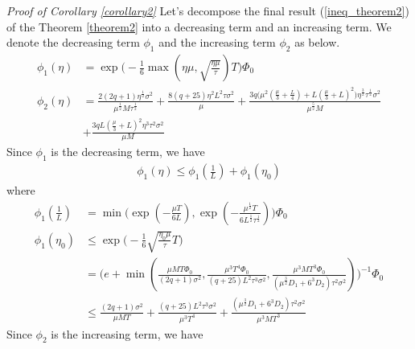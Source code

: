 \documentclass[11pt]{article}
\begin{document}
\emph{Proof of Corollary \ref{corollary2}} \textrm{ } Let's decompose the final result (\ref{ineq_theorem2}) of the Theorem \ref{theorem2} into a decreasing term and an increasing term. We denote the decreasing term $\phi_1$ and the increasing term $\phi_2$ as below.
\begin{align*}
    \phi_1(\eta) &= \exp\Big( -\frac{1}{6}\max(\eta\mu, \sqrt{\frac{\eta\mu}{\tau}})T \Big)\Phi_0 \\
    \phi_2(\eta) &= \frac{2(2q+1)\eta^{\frac{1}{2}}\sigma^2}{\mu^{\frac{1}{2}}M\tau^{\frac{1}{2}}} + \frac{8(q+25)\eta^2 L^2\tau\sigma^2}{\mu} + \frac{3q\Big(\mu^2(\frac{\mu}{3}+\frac{L}{4}) + L(\frac{\mu}{3}+L)^2\Big)\eta^{\frac{3}{2}}\tau^{\frac{1}{2}}\sigma^2}{\mu^{\frac{5}{2}}M} \\
    &+ \frac{3qL(\frac{\mu}{3}+L)^2 \eta^3\tau^2\sigma^2}{\mu M}
\end{align*}
Since $\phi_1$ is the decreasing term, we have
\begin{align} \label{ineq_corollary2-1}
    \phi_1(\eta) \leq \phi_1(\frac{1}{L}) + \phi_1(\eta_0)
\end{align}
where
\begin{align*}
    \phi_1(\frac{1}{L}) &= \min \Big( \exp(-\frac{\mu T}{6L}), \exp(-\frac{\mu^{\frac{1}{2}}T}{6 L^{\frac{1}{2}}\tau^{\frac{1}{2}}})\Big) \Phi_0 \\
    \phi_1(\eta_0) &\leq \exp \Big( -\frac{1}{6} \sqrt{\frac{\eta_0 \mu}{\tau}}T\Big) \\
    &= \Big(e+\min(\frac{\mu M T \Phi_0}{(2q+1)\sigma^2}, \frac{\mu^3 T^4\Phi_0}{(q+25)L^2\tau^3\sigma^2}, \frac{\mu^3 M T^3\Phi_0}{(\mu^{\frac{3}{2}}D_1+6^3 D_2)\tau^2\sigma^2}) \Big)^{-1} \Phi_0 \\
    &\leq \frac{(2q+1)\sigma^2}{\mu MT} + \frac{(q+25)L^2\tau^3\sigma^2}{\mu^3 T^4} + \frac{(\mu^{\frac{3}{2}}D_1+6^3 D_2)\tau^2\sigma^2}{\mu^3 M T^3}
\end{align*}
Since $\phi_2$ is the increasing term, we have
\end{document}
